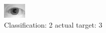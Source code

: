 \begin{figure}[h!]
\begin{center}
\includegraphics[width=0.60\columnwidth]{figures/ID1178_class_2_target_3.png}
\end{center}
\caption{ Classification: 2 actual target: 3}
\label{fig:ID1178_class_2_target_3}
\end{figure}
